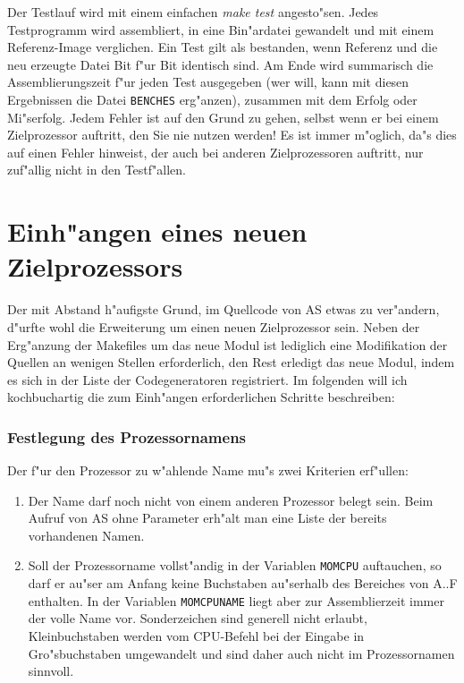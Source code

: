 \documentclass[12pt,a4paper,twoside]{report}
\newcommand{\tty}[1]{{\tt #1}}
\begin{document}
Der Testlauf wird mit einem einfachen {\em make test} angesto"sen.  Jedes
Testprogramm wird assembliert, in eine Bin"ardatei gewandelt und mit einem
Referenz-Image verglichen.  Ein Test gilt als bestanden, wenn Referenz und
die neu erzeugte Datei Bit f"ur Bit identisch sind.  Am Ende wird
summarisch die Assemblierungszeit f"ur jeden Test ausgegeben (wer will,
kann mit diesen Ergebnissen die Datei {\tt BENCHES} erg"anzen), zusammen
mit dem Erfolg oder Mi"serfolg.  Jedem Fehler ist auf den Grund zu gehen,
selbst wenn er bei einem Zielprozessor auftritt, den Sie nie nutzen
werden!  Es ist immer m"oglich, da"s dies auf einen Fehler hinweist, der
auch bei anderen Zielprozessoren auftritt, nur zuf"allig nicht in den
Testf"allen.


\section{Einh"angen eines neuen Zielprozessors}

Der mit Abstand h"aufigste Grund, im Quellcode von AS etwas zu ver"andern,
d"urfte wohl die Erweiterung um einen neuen Zielprozessor sein.  Neben der
Erg"anzung der Makefiles um das neue Modul ist lediglich eine Modifikation
der Quellen an wenigen Stellen erforderlich, den Rest erledigt das neue
Modul, indem es sich in der Liste der Codegeneratoren registriert.  Im
folgenden will ich kochbuchartig die zum Einh"angen erforderlichen
Schritte beschreiben:

\subsubsection{Festlegung des Prozessornamens}

Der f"ur den Prozessor zu w"ahlende Name mu"s zwei Kriterien erf"ullen:
\begin{enumerate}
\item{Der Name darf noch nicht von einem anderen Prozessor belegt sein.
      Beim Aufruf von AS ohne Parameter erh"alt man eine Liste der bereits
      vorhandenen Namen.}
\item{Soll der Prozessorname vollst"andig in der Variablen \tty{MOMCPU}
      auftauchen, so darf er au"ser am Anfang keine Buchstaben au"serhalb
      des Bereiches von A..F enthalten.  In der Variablen \tty{MOMCPUNAME}
      liegt aber zur Assemblierzeit immer der volle Name vor.
      Sonderzeichen sind generell nicht erlaubt, Kleinbuchstaben
      werden vom CPU-Befehl bei der Eingabe in Gro"sbuchstaben umgewandelt
      und sind daher auch nicht im Prozessornamen sinnvoll.}
\end{enumerate}
\end{document}
